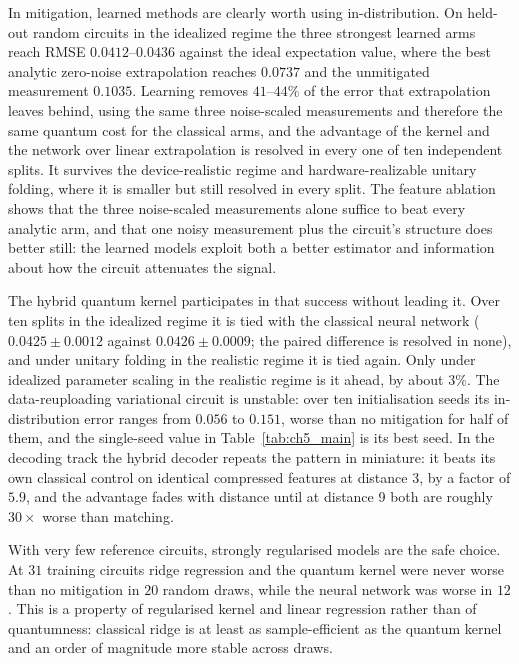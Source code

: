\documentclass[Thesis.tex]{subfiles}
\begin{document}
In mitigation, learned methods are clearly worth using in-distribution. On held-out random
circuits in the idealized regime the three strongest learned arms reach RMSE
$0.0412$--$0.0436$ against the ideal expectation value, where the best analytic
zero-noise extrapolation reaches $0.0737$ and the unmitigated measurement $0.1035$.
Learning removes $41$--$44\%$ of the error that extrapolation leaves behind, using
the same three noise-scaled measurements and therefore the same quantum cost for the
classical arms, and the advantage of the kernel and the network over linear
extrapolation is resolved in every one of ten independent splits. It survives the
device-realistic regime and hardware-realizable unitary folding, where it is
smaller but still resolved in every split. The feature ablation shows that the three
noise-scaled measurements alone suffice to beat every analytic arm, and that one
noisy measurement plus the circuit's structure does better still: the learned models
exploit both a better estimator and information about how the circuit attenuates
the signal.

The hybrid quantum kernel participates in that success without leading it. Over ten
splits in the idealized regime it is tied with the classical neural network
($0.0425 \pm 0.0012$ against $0.0426 \pm 0.0009$; the paired difference is resolved
in none), and under unitary folding in the realistic regime it is tied again. Only
under idealized parameter scaling in the realistic regime is it ahead, by about
$3\%$. The
data-reuploading variational circuit is unstable: over ten initialisation seeds its
in-distribution error ranges from $0.056$ to $0.151$, worse than no mitigation for
half of them, and the single-seed value in Table~\ref{tab:ch5_main} is its best
seed. In the decoding track the hybrid decoder repeats the pattern in miniature: it
beats its own classical control on identical compressed features at distance 3, by a
factor of $5.9$, and the advantage fades with distance until at distance 9 both are
roughly $30\times$ worse than matching.

With very few reference circuits, strongly regularised models are the safe choice.
At $31$ training circuits ridge regression and the quantum kernel were never worse
than no mitigation in $20$ random draws, while the neural network was worse in $12$.
This is a property of regularised kernel and linear regression rather than of
quantumness: classical ridge is at least as sample-efficient as the quantum kernel
and an order of magnitude more stable across draws.
\end{document}
